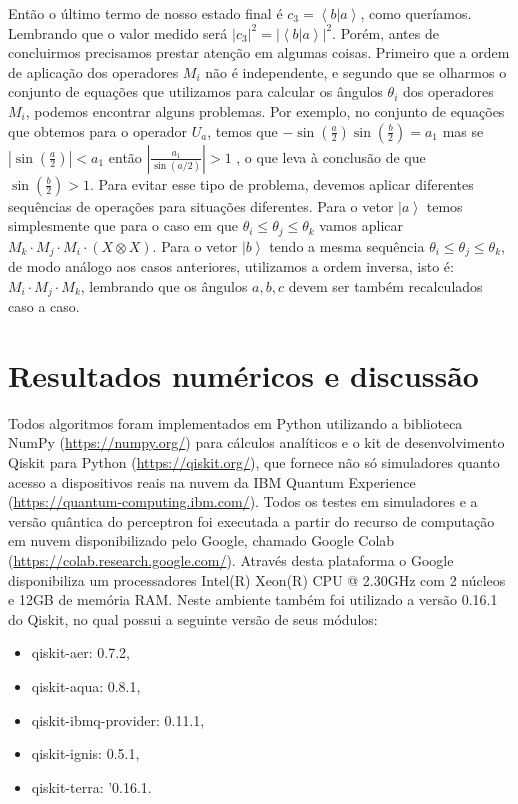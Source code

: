 Então o último termo de nosso estado final é $c_{3}=\left\langle b|a\right\rangle $, como queríamos. Lembrando que o valor medido será $\left|c_{3}\right|^2=\left|\left\langle b|a\right\rangle \right|^{2}$.  Porém, antes de concluirmos precisamos prestar atenção em algumas coisas. Primeiro que a ordem de aplicação dos operadores $M_i$ não é independente, e segundo que se olharmos o conjunto de equações que utilizamos para calcular os ângulos $\theta_i$ dos operadores $M_i$, podemos encontrar alguns problemas. Por exemplo, no conjunto de equações que obtemos para o operador $U_a$, temos que $-\sin\left(\frac{a}{2}\right)\sin\left(\frac{b}{2}\right)=a_{1}$  mas se $\left|\sin\left(\frac{a}{2}\right)\right|<a_{1}$  então $\left|\frac{a_{1}}{\sin\left(a/2\right)}\right|>1$ , o que leva à conclusão de que $\sin\left(\frac{b}{2}\right)>1$. Para evitar esse tipo de problema, devemos aplicar diferentes sequências de operações para situações diferentes. Para o vetor $\left|a\right\rangle $ temos simplesmente que para o caso em que $\theta_i \leq \theta_j \leq \theta_k$   vamos aplicar $M_k \cdot M_j \cdot M_i  \cdot \left(X\otimes X\right)$. Para o vetor $\left|b\right\rangle $ tendo a mesma sequência $\theta_i \leq \theta_j \leq \theta_k$, de modo análogo aos casos anteriores, utilizamos a ordem inversa, isto é: $M_i \cdot M_j \cdot M_k  $, lembrando que os ângulos $a,b,c$ devem ser também recalculados caso a caso.

\section{Resultados numéricos  e discussão}

Todos algoritmos foram implementados em Python utilizando a biblioteca NumPy (\url{https://numpy.org/}) para cálculos analíticos e o kit de desenvolvimento Qiskit para Python (\url{https://qiskit.org/}), que fornece não só simuladores quanto acesso a dispositivos reais na nuvem da IBM Quantum Experience  (\url{https://quantum-computing.ibm.com/}). Todos os testes em simuladores e a versão quântica do perceptron foi executada a partir do recurso de computação em nuvem disponibilizado pelo Google, chamado Google Colab (\url{https://colab.research.google.com/}). Através desta plataforma o Google disponibiliza um processadores Intel(R) Xeon(R) CPU @ 2.30GHz com 2 núcleos e 12GB de memória RAM. Neste ambiente também foi utilizado a versão 0.16.1 do Qiskit, no qual possui a seguinte versão de seus módulos:
\begin{itemize}
    \item qiskit-aer: 0.7.2,
    \item qiskit-aqua: 0.8.1,
    \item qiskit-ibmq-provider: 0.11.1,
    \item qiskit-ignis: 0.5.1,
    \item qiskit-terra: '0.16.1.
\end{itemize}

